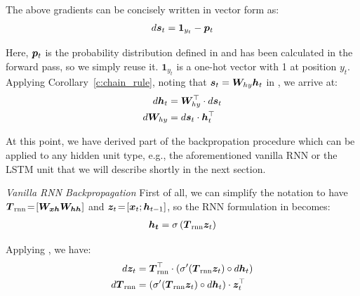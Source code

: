 The above gradients can be concisely written in vector form as:
\begin{align}
d\bm{s}_{t} = \bm{1}_{y_t} - \bm{p}_{t}
\end{align}

Here, $\bm{p}_{t}$ is the probability distribution defined in  and has been calculated in the forward pass,
so we simply reuse it. $\bm{1}_{y_t}$ is a one-hot vector with 1 at position
$y_t$. 
Applying Corollary~\ref{c:chain_rule}, noting that $\bm{s}_{t} = \bm{W}_{hy}\bm{h}_{t}$ in , we
arrive at:
\begin{align}
d\bm{h}_{t} &=  \bm{W}_{hy}^\top \cdot d\bm{s}_{t} \label{e:grad_ht}\\
d\bm{W}_{hy} &=  d\bm{s}_{t} \cdot \bm{h}_{t}^\top \label{e:grad_Why}
\end{align}

At this point, we have derived part of the backpropation procedure which can be
applied to any hidden unit type, e.g., the aforementioned vanilla RNN or the
LSTM unit that we will describe shortly in the next section. 

{\it Vanilla RNN Backpropagation} \indent 
First of all, we can simplify the notation to have $\mbox{\boldmath{$T$}}_{\text{rnn}}\!=\![\mbox{\boldmath{$W_{xh}$}}
\mbox{\boldmath{$W_{hh}$}}]$ and $\bm{z}_{t}\!=\![\bm{x}_{t};
\bm{h}_{t-1}]$, so the RNN formulation in  %
becomes:
\begin{align}
\mbox{\boldmath{$h_t$}} = \sigma \left(\mbox{\boldmath{$T$}}_{\text{rnn}} \bm{z}_{t}\right) \label{e:rnn_simplified}
\end{align}

Applying , we have:
\begin{align}
d\bm{z}_{t} &=  \mbox{\boldmath{$T$}}_{\text{rnn}}^\top \cdot
\left(\sigma'(\mbox{\boldmath{$T$}}_{\text{rnn}} \bm{z}_{t}) \circ d\bm{h}_{t}\right) \label{e:grad_zt} \\
d\mbox{\boldmath{$T$}}_{\text{rnn}} &=  \left(\sigma'(\mbox{\boldmath{$T$}}_{\text{rnn}} \bm{z}_{t}) \circ d\bm{h}_{t}\right) \cdot \bm{z}_{t}^\top \label{e:grad_rnn}
\end{align}

